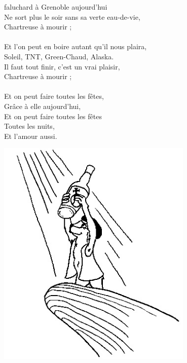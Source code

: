 
 faluchard à Grenoble aujourd'hui 
\\Ne sort plus le soir sans sa verte eau-de-vie,
\\Chartreuse à mourir ;
\\\\Et l'on peut en boire autant qu'il nous plaira,
\\Soleil, TNT, Green-Chaud, Alaska.
\\Il faut tout finir, c'est un vrai plaisir,
\\Chartreuse à mourir ;
\\\\Et on peut faire toutes les fêtes, 
\\Grâce à elle aujourd'hui,
\\Et on peut faire toutes les fêtes 
\\Toutes les nuits,
\\Et l'amour aussi.
\begin{center}
\includegraphics[width=0.7\textwidth]{images/chartreuse.jpg}
\end{center}

\breakpage